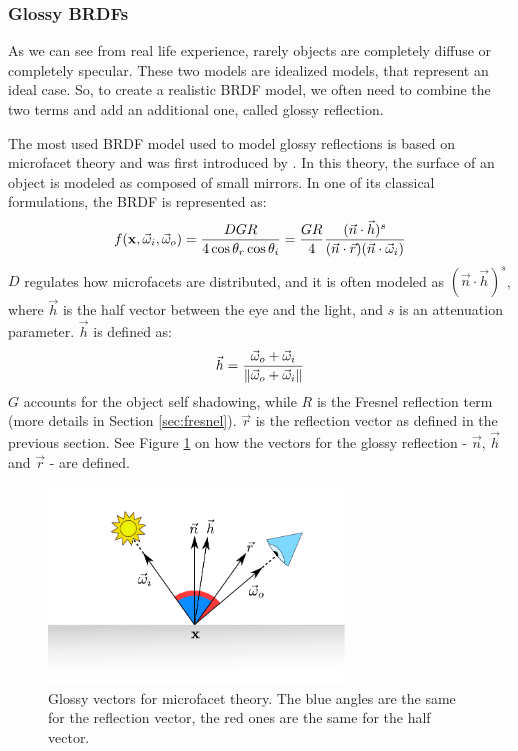 \subsubsection{Glossy BRDFs}

As we can see from real life experience, rarely objects are completely diffuse or completely specular. These two models are idealized models, that represent an ideal case. So, to create a realistic BRDF model, we often need to combine the two terms and add an additional one, called glossy reflection.

The most used BRDF model used to model glossy reflections is based on microfacet theory \citep{Torrance:1992:TOR:136913.136924, Ashikmin:2000:MBG:344779.344814} and was first introduced by \citep{Blinn:1977:MLR:965141.563893}. In this theory, the surface of an object is modeled as composed of small mirrors. In one of its classical formulations, the BRDF is represented as:
$$
f(\mathbf{x}, \vec{\omega}_i, \vec{\omega}_o) = \frac{D G R}{4 \cos\theta_r \cos\theta_i} = \frac{G R}{4} \frac{(\vec{n}\cdot\vec{h})^s}{(\vec{n}\cdot\vec{r})(\vec{n}\cdot\vec{\omega}_i)}
$$
$D$ regulates how microfacets are distributed, and it is often modeled as $(\vec{n}\cdot\vec{h})^s$, where $\vec{h}$ is the half vector between the eye and the light, and $s$ is an attenuation parameter. $\vec{h}$ is defined as:
$$
\vec{h} = \frac{\vec{\omega}_o + \vec{\omega}_i}{\left\| \vec{\omega}_o + \vec{\omega}_i \right\|}
$$
$G$ accounts for the object self shadowing, while $R$ is the Fresnel reflection term (more details in Section \ref{sec:fresnel}).	$\vec{r}$ is the reflection vector as defined in the previous section. See Figure \ref{fig:glossysetup} on how the vectors for the glossy reflection - $\vec{n}$, $\vec{h}$ and $\vec{r}$ - are defined.


\begin{figure}[!ht]
\centering
\includegraphics[width=0.7\textwidth]{images/glossy_setup.pdf}
\caption{Glossy vectors for microfacet theory. The blue angles are the same for the reflection vector, the red ones are the same for the half vector.}
\label{fig:glossysetup}
\end{figure}
 
